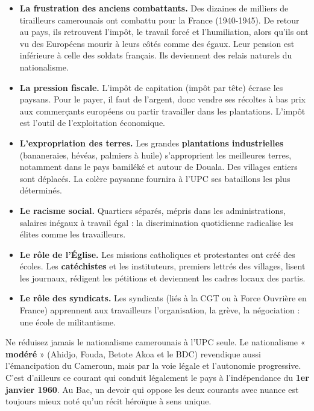 \documentclass[11pt]{article}
\newcommand{\cle}[1]{{\popxbold\color{popdark}#1}}
\begin{document}
\begin{itemize}
\item \textbf{La frustration des anciens combattants.} Des dizaines de milliers de \cle{tirailleurs} camerounais ont combattu pour la France (1940-1945). De retour au pays, ils retrouvent l'impôt, le travail forcé et l'humiliation, alors qu'ils ont vu des Européens mourir à leurs côtés comme des égaux. Leur pension est inférieure à celle des soldats français. Ils deviennent des relais naturels du nationalisme.
\item \textbf{La pression fiscale.} L'\cle{impôt de capitation} (impôt par tête) écrase les paysans. Pour le payer, il faut de l'argent, donc vendre ses récoltes à bas prix aux commerçants européens ou partir travailler dans les plantations. L'impôt est l'outil de l'exploitation économique.
\item \textbf{L'expropriation des terres.} Les grandes \textbf{plantations industrielles} (bananeraies, hévéas, palmiers à huile) s'approprient les meilleures terres, notamment dans le pays bamiléké et autour de Douala. Des villages entiers sont déplacés. La colère paysanne fournira à l'UPC ses bataillons les plus déterminés.
\item \textbf{Le racisme social.} Quartiers séparés, mépris dans les administrations, salaires inégaux à travail égal : la discrimination quotidienne radicalise les élites comme les travailleurs.
\item \textbf{Le rôle de l'Église.} Les missions catholiques et protestantes ont créé des écoles. Les \textbf{catéchistes} et les instituteurs, premiers lettrés des villages, lisent les journaux, rédigent les pétitions et deviennent les cadres locaux des partis.
\item \textbf{Le rôle des syndicats.} Les syndicats (liés à la CGT ou à Force Ouvrière en France) apprennent aux travailleurs l'organisation, la grève, la négociation : une école de militantisme.
\end{itemize}

\begin{attention}
Ne réduisez jamais le nationalisme camerounais à l'UPC seule. Le nationalisme « \textbf{modéré} » (Ahidjo, Fouda, Betote Akoa et le BDC) revendique aussi l'émancipation du Cameroun, mais par la voie légale et l'autonomie progressive. C'est d'ailleurs ce courant qui conduit légalement le pays à l'indépendance du \textbf{1er janvier 1960}. Au Bac, un devoir qui oppose les deux courants avec nuance est toujours mieux noté qu'un récit héroïque à sens unique.
\end{attention}
\end{document}
